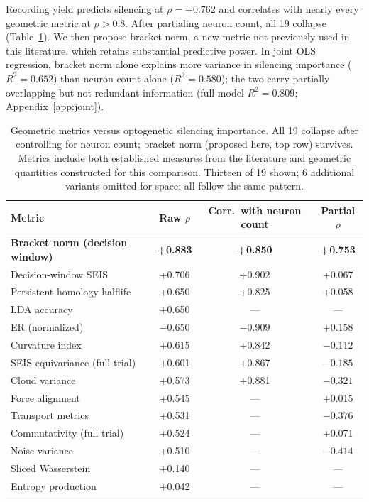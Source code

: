 \documentclass[9pt,lineno]{elife}
\begin{document}
Recording yield predicts silencing at $\rho = +0.762$ and correlates with nearly every geometric metric at $\rho > 0.8$. After partialing neuron count, all 19 collapse (Table~\ref{tab:confound}). We then propose bracket norm, a new metric not previously used in this literature, which retains substantial predictive power. In joint OLS regression, bracket norm alone explains more variance in silencing importance ($R^2 = 0.652$) than neuron count alone ($R^2 = 0.580$); the two carry partially overlapping but not redundant information (full model $R^2 = 0.809$; Appendix~\ref{app:joint}).

\begin{table}[t]
\centering
\caption{Geometric metrics versus optogenetic silencing importance. All 19 collapse after controlling for neuron count; bracket norm (proposed here, top row) survives. Metrics include both established measures from the literature and geometric quantities constructed for this comparison. Thirteen of 19 shown; 6 additional variants omitted for space; all follow the same pattern.}
\label{tab:confound}
\begin{tabular}{lccc}
\toprule
Metric & Raw $\rho$ & Corr.\ with neuron count & Partial $\rho$ \\
\midrule
\textbf{Bracket norm (decision window)} & \textbf{+0.883} & \textbf{+0.850} & \textbf{+0.753} \\
Decision-window SEIS & +0.706 & +0.902 & +0.067 \\
Persistent homology halflife & +0.650 & +0.825 & +0.058 \\
LDA accuracy & +0.650 & --- & --- \\
ER (normalized) & $-0.650$ & $-0.909$ & +0.158 \\
Curvature index & +0.615 & +0.842 & $-0.112$ \\
SEIS equivariance (full trial) & +0.601 & +0.867 & $-0.185$ \\
Cloud variance & +0.573 & +0.881 & $-0.321$ \\
Force alignment & +0.545 & --- & +0.015 \\
Transport metrics & +0.531 & --- & $-0.376$ \\
Commutativity (full trial) & +0.524 & --- & +0.071 \\
Noise variance & +0.510 & --- & $-0.414$ \\
Sliced Wasserstein & +0.140 & --- & --- \\
Entropy production & +0.042 & --- & --- \\
\bottomrule
\end{tabular}
\end{table}
\end{document}

